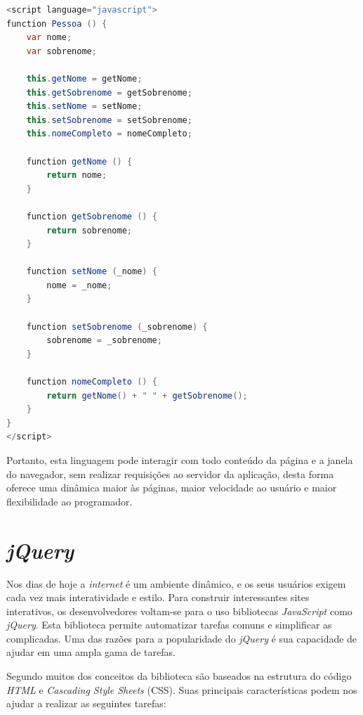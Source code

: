 {\singlespace
\begin{lstlisting}[caption=Classe Pessoa em \textit{JavaScript},language=Java,label={lst:codigo22}]
<script language="javascript">
function Pessoa () {
    var nome;
    var sobrenome;
    
    this.getNome = getNome;
    this.getSobrenome = getSobrenome;
    this.setNome = setNome;
    this.setSobrenome = setSobrenome;
    this.nomeCompleto = nomeCompleto;
    
    function getNome () {
        return nome;
    }
    
    function getSobrenome () {
        return sobrenome;
    }
    
    function setNome (_nome) {
        nome = _nome;
    }
    
    function setSobrenome (_sobrenome) {
        sobrenome = _sobrenome;
    }
    
    function nomeCompleto () {
        return getNome() + " " + getSobrenome();
    }
}
</script>
\end{lstlisting}
}

Portanto, esta linguagem pode interagir com todo conteúdo da página e a janela do navegador, sem realizar requisições ao servidor da aplicação, desta forma oferece uma dinâmica maior às páginas, maior velocidade ao usuário e maior flexibilidade ao programador.

\section{\textit{jQuery}}
\label{sec:jquery}

Nos dias de hoje a \textit{internet} é um ambiente dinâmico, e os seus usuários exigem cada vez mais interatividade e estilo. Para construir interessantes sites interativos, os desenvolvedores voltam-se para o uso bibliotecas \textit{JavaScript} como \textit{jQuery}. Esta biblioteca permite automatizar tarefas comuns e simplificar as complicadas. Uma das razões para a popularidade do \textit{jQuery} é sua capacidade de ajudar em uma ampla gama de tarefas.

Segundo  muitos dos conceitos da biblioteca são baseados na estrutura do código \textit{HTML} e \textit{Cascading Style Sheets} (CSS). Suas principais características podem nos ajudar a realizar as seguintes tarefas:

